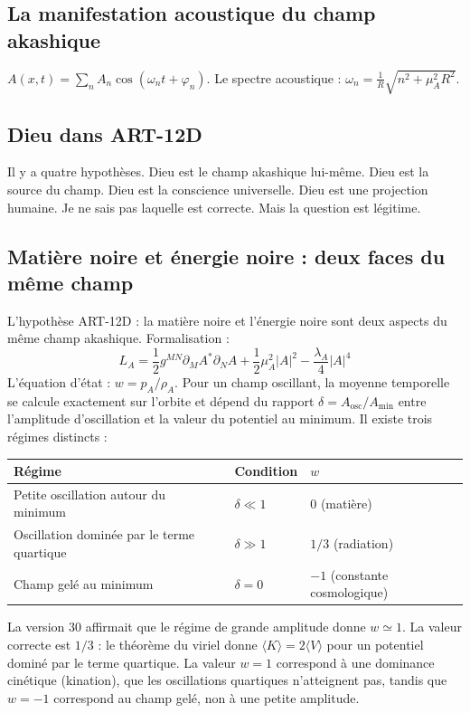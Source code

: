 \documentclass[11pt,a4paper]{article}
\begin{document}
\subsection{La manifestation acoustique du champ akashique}
$A(x,t) = \sum_n A_n \cos(\omega_n t + \varphi_n)$. Le spectre acoustique : $\omega_n = \frac{1}{R} \sqrt{n^2 + \mu_A^2 R^2}$.

\subsection{Dieu dans ART-12D}
Il y a quatre hypothèses. Dieu est le champ akashique lui-même. Dieu est la source du champ. Dieu est la conscience universelle. Dieu est une projection humaine. Je ne sais pas laquelle est correcte. Mais la question est légitime.

\subsection{Matière noire et énergie noire : deux faces du même champ}
L'hypothèse ART-12D : la matière noire et l'énergie noire sont deux aspects du même champ akashique. Formalisation :
\begin{equation}
L_A = \frac{1}{2} g^{MN} \partial_M A^* \partial_N A + \frac{1}{2} \mu_A^2 |A|^2 - \frac{\lambda_A}{4} |A|^4
\end{equation}
L'équation d'état : $w = p_A / \rho_A$. Pour un champ oscillant, la moyenne temporelle se calcule exactement sur l'orbite et dépend du rapport $\delta = A_{\text{osc}}/A_{\min}$ entre l'amplitude d'oscillation et la valeur du potentiel au minimum. Il existe trois régimes distincts :
\begin{center}
\begin{tabular}{@{}lll@{}}
\toprule
\textbf{Régime} & \textbf{Condition} & $w$ \\ \midrule
Petite oscillation autour du minimum & $\delta \ll 1$ & $0$ (matière) \\
Oscillation dominée par le terme quartique & $\delta \gg 1$ & $1/3$ (radiation) \\
Champ gelé au minimum & $\delta = 0$ & $-1$ (constante cosmologique) \\ \bottomrule
\end{tabular}
\end{center}
La version 30 affirmait que le régime de grande amplitude donne $w \simeq 1$. La valeur correcte est $1/3$ : le théorème du viriel donne $\langle K \rangle = 2\langle V \rangle$ pour un potentiel dominé par le terme quartique. La valeur $w = 1$ correspond à une dominance cinétique (kination), que les oscillations quartiques n'atteignent pas, tandis que $w = -1$ correspond au champ gelé, non à une petite amplitude.
\end{document}
